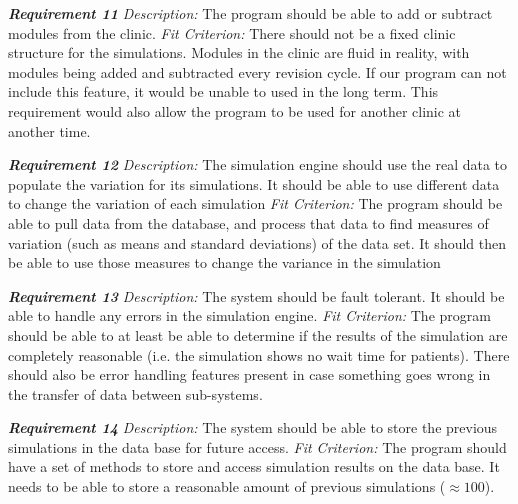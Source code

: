 \documentclass[12pt, titlepage]{article}
\begin{document}
\noindent\textbf{\textit{Requirement 11}}\newline
\textit{Description:}\newline
The program should be able to add or subtract modules from the clinic. 
\newline\newline
\textit{Fit Criterion:}\newline 
There should not be a fixed clinic structure for the simulations. Modules in the clinic are fluid in reality, with modules being added and subtracted every revision cycle. If our program can not include this feature, it would be unable to used in the long term. This requirement would also allow the program to be used for another clinic at another time.\newline

\noindent\textbf{\textit{Requirement 12}}\newline
\textit{Description:}\newline
The simulation engine should use the real data to populate the variation for its simulations. It should be able to use different data to change the variation of each simulation
\newline\newline
\textit{Fit Criterion:}\newline 
The program should be able to pull data from the database, and process that data to find measures of variation (such as means and standard deviations) of the data set. It should then be able to use those measures to change the variance in the simulation \newline

\noindent\textbf{\textit{Requirement 13}}\newline
\textit{Description:}\newline
The system should be fault tolerant. It should be able to handle any errors in the simulation engine.
\newline\newline
\textit{Fit Criterion:}\newline 
The program should be able to at least be able to determine if the results of the simulation are completely reasonable (i.e. the simulation shows no wait time for patients). There should also be error handling features present in case something goes wrong in the transfer of data between sub-systems. \newline

\noindent\textbf{\textit{Requirement 14}}\newline
\textit{Description:}\newline
The system should be able to store the previous simulations in the data base for future access.
\newline\newline
\textit{Fit Criterion:}\newline 
The program should have a set of methods to store and access simulation results on the data base. It needs to be able to store a reasonable amount of previous simulations ($\approx 100$).  \newline
\end{document}

